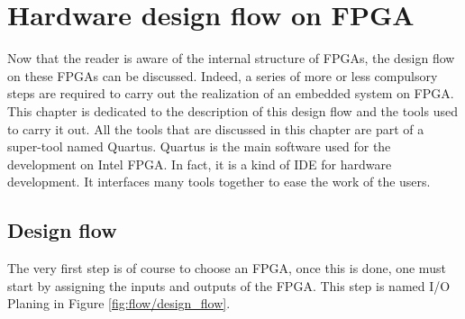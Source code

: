 \chapter{Hardware design flow on FPGA}

Now that the reader is aware of the internal structure of FPGAs, the design flow on these FPGAs can 
be discussed. Indeed, a series of more or less compulsory steps are required to carry out the 
realization of an embedded system on FPGA. This chapter is dedicated to the description of this 
design flow and the tools used to carry it out. All the tools that are discussed in this chapter are
part of a super-tool named Quartus. Quartus is the main software used for the development on Intel 
FPGA. In fact, it is a kind of IDE for hardware development. It interfaces many tools together to
ease the work of the users.

\section{Design flow}

The very first step is of course to choose an FPGA, once this is done, one must start by assigning 
the inputs and outputs of the FPGA. This step is named I/O Planing in Figure \ref{fig:flow/design_flow}.

